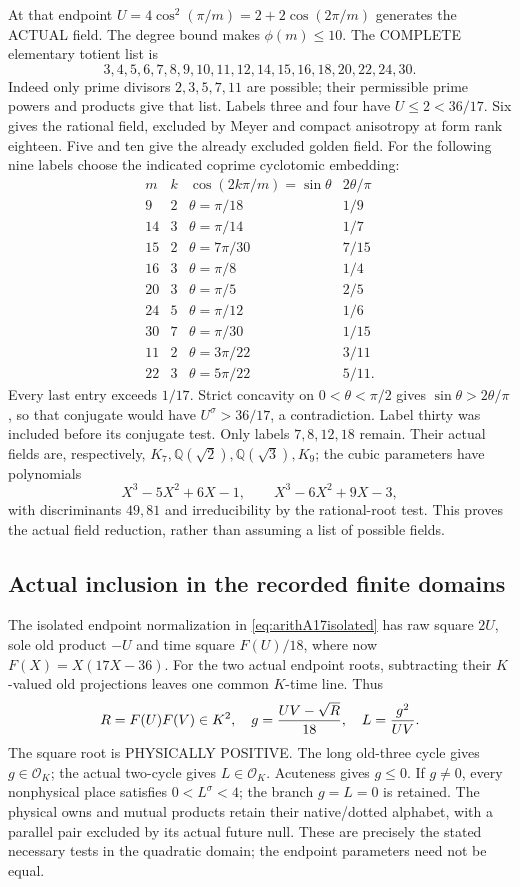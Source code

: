 \documentclass[11pt]{article}
\begin{document}
At that endpoint \(U=4\cos^2(\pi/m)=2+2\cos(2\pi/m)\)
generates the ACTUAL field.
The degree bound makes \(\phi(m)\le10\).
The COMPLETE elementary totient list is
\[
 3,4,5,6,7,8,9,10,11,12,14,15,16,18,20,22,24,30 .
\]
Indeed only prime divisors \(2,3,5,7,11\) are possible;
their permissible prime powers and products give that list.
Labels three and four have \(U\le2<36/17\).
Six gives the rational field, excluded by Meyer and compact
anisotropy at form rank eighteen.
Five and ten give the already excluded golden field.
For the following nine labels choose the indicated coprime
cyclotomic embedding:
\[
\begin{array}{c|c|c|c}
m&k&\cos(2k\pi/m)=\sin\theta&2\theta/\pi\\ \hline
9&2&\theta=\pi/18&1/9\\
14&3&\theta=\pi/14&1/7\\
15&2&\theta=7\pi/30&7/15\\
16&3&\theta=\pi/8&1/4\\
20&3&\theta=\pi/5&2/5\\
24&5&\theta=\pi/12&1/6\\
30&7&\theta=\pi/30&1/15\\
11&2&\theta=3\pi/22&3/11\\
22&3&\theta=5\pi/22&5/11 .
\end{array}
\]
Every last entry exceeds \(1/17\).
Strict concavity on \(0<\theta<\pi/2\) gives
\(\sin\theta>2\theta/\pi\), so that conjugate would have
\(U^\sigma>36/17\), a contradiction.
Label thirty was included before its conjugate test.
Only labels \(7,8,12,18\) remain.
Their actual fields are, respectively,
\(K_7,\mathbb Q(\sqrt2),\mathbb Q(\sqrt3),K_9\);
the cubic parameters have polynomials
\[
 X^3-5X^2+6X-1,\qquad X^3-6X^2+9X-3,
\]
with discriminants \(49,81\) and irreducibility by the
rational-root test.  This proves the actual field reduction,
rather than assuming a list of possible fields.

\subsection{Actual inclusion in the recorded finite domains}
\label{app:arithA17datainclusion}

The isolated endpoint normalization in
\eqref{eq:arithA17isolated} has raw square \(2U\), sole old
product \(-U\) and time square \(F(U)/18\), where now
\(F(X)=X(17X-36)\).
For the two actual endpoint roots, subtracting their \(K\)-valued
old projections leaves one common \(K\)-time line.
Thus
\[
 R=F(U)F(V)\in K^2,\quad
 g={UV-\sqrt R\over18},\quad
 L={g^2\over UV}.
\]
The square root is PHYSICALLY POSITIVE.
The long old-three cycle gives \(g\in\mathcal O_K\);
the actual two-cycle gives \(L\in\mathcal O_K\).
Acuteness gives \(g\le0\).
If \(g\ne0\), every nonphysical place satisfies \(0<L^\sigma<4\);
the branch \(g=L=0\) is retained.
The physical owns and mutual products retain their native/dotted
alphabet, with a parallel pair excluded by its actual future null.
These are precisely the stated necessary tests in the quadratic
domain; the endpoint parameters need not be equal.
\end{document}

